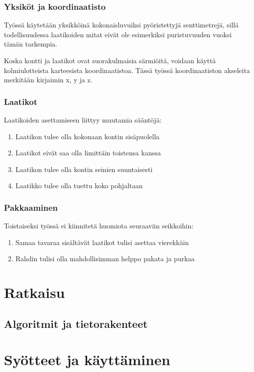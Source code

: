 \documentclass[a4paper,12pt, titlepage]{article}
\begin{document}
\subsubsection*{Yksiköt ja koordinaatisto}
Työssä käytetään yksikköinä kokonaisluvuiksi pyöristettyjä senttimetrejä, sillä todellisuudessa laatikoiden mitat eivät ole esimerkiksi puristuvuuden vuoksi tämän tarkempia. \newline

\noindent
Koska kontti ja laatikot ovat suorakulmaisia särmiöitä, voidaan käyttä kolmiulotteista karteesista koordinaatistoa. Tässä työssä koordinaatiston akseleita merkitään kirjaimin x, y ja z.

\subsubsection*{Laatikot}
Laatikoiden asettamiseen liittyy muutamia sääntöjä:
\begin{enumerate}
	\item Laatikon tulee olla kokonaan kontin sisäpuolella
	\item Laatikot eivät saa olla limittäin toistensa kanssa
	\item Laatikon tulee olla kontin seinien suuntaisesti
	\item Laatikko tulee olla tuettu koko pohjaltaan
\end{enumerate}


\subsubsection*{Pakkaaminen}
Toistaiseksi työssä ei kiinnitetä huomiota seuraaviin seikkoihin:

\begin{enumerate}
	\item Samaa tavaraa sisältävät laatikot tulisi asettaa vierekkäin
	\item Rahdin tulisi olla mahdollisimman helppo pakata ja purkaa
\end{enumerate}

\section*{Ratkaisu}
\subsection*{Algoritmit ja tietorakenteet}

\section*{Syötteet ja käyttäminen}
\end{document}
